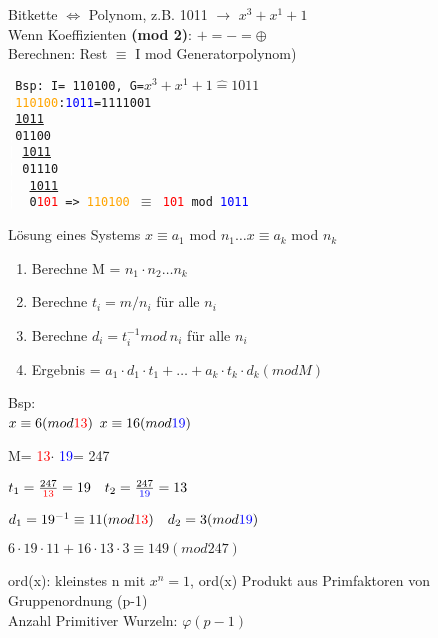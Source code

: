 Bitkette $\Leftrightarrow$ Polynom, z.B. 1011 $\rightarrow$ $x^3 + x ^1 + 1$\\
Wenn Koeffizienten \textbf{(mod 2)}: $+=-= \oplus$\\
Berechnen: Rest $\equiv$ I mod Generatorpolynom)

\texttt{ %
\newcommand{\divisor}{\underline{1011}\\}
Bsp: I= 110100, G=$x^3 + x ^1 + 1 \widehat{=}1011$\\
\textcolor{white}{|}\textcolor{orange}{110100}:\textcolor{blue}{1011}=1111001\\
\textcolor{white}{|}\divisor
\textcolor{white}{|}01100\\
\textcolor{white}{|}~\divisor
\textcolor{white}{|}~01110\\
\textcolor{white}{|}~~\divisor
\textcolor{white}{|}~~0\textcolor{red}{101}   => \textcolor{orange}{110100} $\equiv$ \textcolor{red}{101} mod \textcolor{blue}{1011}
}



Lösung eines Systems $x \equiv a_1$ mod $n_1 \dots  x \equiv a_k$ mod $ n_k$
\begin{enumerate}
\item Berechne M = $n_1 \cdot n_2 \dots n_k$
\item Berechne $t_i = m / n_i$ für alle $n_i$
\item Berechne $d_i = t_i^{-1} mod~n_i$ für alle $n_i$ \Euklid
\item Ergebnis = $ a_1 \cdot d_1 \cdot t_1 + \dots + a_k \cdot t_k \cdot d_k  (mod M)$
\end{enumerate}
Bsp: \\									\newcommand{\Neins}{\textcolor{red}{13}}  \newcommand{\Nzwei}{\textcolor{blue}{19}}
$x \equiv 6 (mod \Neins )$ $x \equiv 16 (mod \Nzwei) $

M= \Neins $\cdot$ \Nzwei = 247

$t_1 =\frac{247}{\Neins} =19~~~t_2 = \frac{247}{\Nzwei} =13 $

$d_1 = 19^{-1} \equiv  11 (mod \Neins)~~~ d_2 = 3 ( mod \Nzwei)$ \Euklid

$ 6 \cdot 19 \cdot 11 + 16 \cdot 13 \cdot 3 \equiv 149 (mod 247) $


ord(x): kleinstes n mit $x^n=1$, ord(x) Produkt aus Primfaktoren von Gruppenordnung (p-1)\\
Anzahl Primitiver Wurzeln: $\varphi(p-1)$\\

